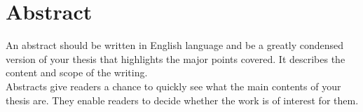 \chapter{Abstract}
\label{cha:abtract} 

An abstract should be written in English language and be a greatly condensed version of your thesis that highlights the major points covered. It describes the content and scope of the writing. \\
Abstracts give readers a chance to quickly see what the main contents of your thesis are. They enable readers to decide whether the work is of interest for them. 
